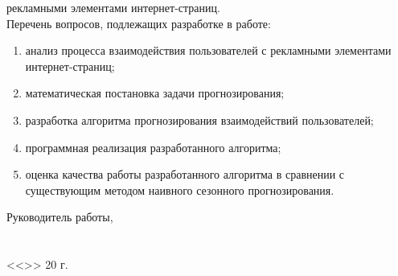 рекламными элементами интернет-страниц.\\
Перечень вопросов, подлежащих разработке в работе: 
\begin{enumerate}
    \item анализ процесса взаимодействия пользователей с рекламными элементами интернет-страниц;
    \item математическая постановка задачи прогнозирования;
    \item разработка алгоритма прогнозирования взаимодействий пользователей;
    \item программная реализация разработанного алгоритма;
    \item оценка качества работы разработанного алгоритма в сравнении с существующим 
    методом наивного сезонного прогнозирования.
\end{enumerate}
\singlespacing{}
Руководитель работы,\\
\vspace{14pt}\\
\vspace{14pt}\\
<<\underline{\hspace{0.75cm}}>> \underline{\hspace{4.13cm}} 20\underline{\hspace{0.75cm}} г.